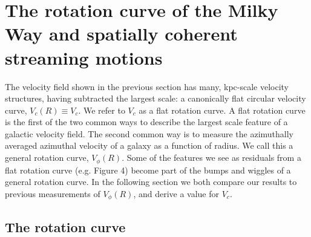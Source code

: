 \section{The rotation curve of the Milky Way and spatially coherent streaming motions}

The velocity field shown in the previous section has many, kpc-scale velocity structures, having subtracted the largest scale: a canonically flat circular velocity curve, $V_c\left(R\right) \equiv V_c$. We refer to $V_c$ as a flat rotation curve. A flat rotation curve is the first of the two common ways to describe the largest scale feature of a galactic velocity field. The second common way is to measure the azimuthally averaged azimuthal velocity of a galaxy as a function of radius. We call this a general rotation curve, $V_\phi\left(R\right)$. Some of the features we see as residuals from a flat rotation curve (e.g. Figure 4) become part of the bumps and wiggles of a general rotation curve. In the following section we both compare our results to previous measurements of $V_\phi\left(R\right)$, and derive a value for $V_c$. 

\label{sec:rotation_curve}

\subsection{The rotation curve}
\label{sec:rotation_fit}

